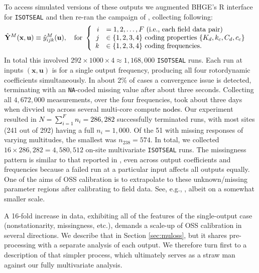 \documentclass[12pt]{article}
\newcommand{\blu}[1]{\textcolor{black}{#1}} %
\newcommand{\blunew}[1]{\textcolor{black}{#1}} %
\begin{document}
To access simulated versions of these outputs we augmented BHGE's {\sf R}
interface for {\tt ISOTSEAL} and then re-ran the campaign
of \cite{Huang:2018}, collecting following:
\begin{align}
\hat{\mathbf{Y}}^M(\mathbf{x}, \mathbf{u}) &\equiv  \hat{y}_{ijk}^M(\mathbf{u}), \quad \mbox{for } \left\{
\begin{array}{rl}
  i &= 1, 2, \dots,\blunew{F} \mbox{ (i.e., each field data pair)} \\
  j &\in \{1,2,3,4\} \mbox{ coding properties } \{K_d, k_c, C_d, c_c \} \\
  k &\in \{1,2,3,4\} \mbox{ coding frequencies.}
\end{array}
\right.
\label{eq:inds}
\end{align}
In total this involved $292 \times 1000 \times 4 \approx 1{,}168{,}000$  {\tt ISOTSEAL}
runs. Each run at inputs $(\mathbf{x}, \mathbf{u})$ is for a single output
frequency, producing all four rotordynamic coefficients simultaneously.
 In about 2\% of cases a convergence
issue is detected, terminating with an {\tt NA}-coded missing value after
about three seconds.  Collecting all $4{,}672{,}000$ measurements, over the four
frequencies, took about three days when divvied up across several multi-core
compute \blu{nodes}.  Our experiment resulted in \blunew{$N=\sum_{i=1}^{F}n_i= 286,282$}
successfully terminated runs, with most sites (241 out of 292) having a full $n_i =
1{,}000$. Of the 51 with missing responses of varying multitudes, the smallest
was $n_{238} = 574$. In total, we collected $16
\times 286{,}282 = 4{,}580{,}512$ on-site multivariate {\tt ISOTSEAL} runs.
The missingness pattern is similar to that reported in
\citet{Huang:2018}, even across output coefficients and frequencies because a
failed run at a particular input affects all outputs equally.  
One of the aims
of OSS calibration is to extrapolate to these unknown/missing parameter
regions after calibrating to field data.  See, e.g., \citet{marcy:2020},
albeit on a somewhat smaller scale.

A 16-fold increase in data, exhibiting all of the features of the
single-output case (nonstationarity, missingness, etc.), demands a scale-up of
OSS calibration in several directions.  We describe that in Section
\ref{sec:muloss}, but it shares pre-processing with a separate analysis of
each output.  We therefore turn first to a description of that simpler
process, which ultimately serves as a straw man against our fully multivariate
analysis.
 
\end{document}
